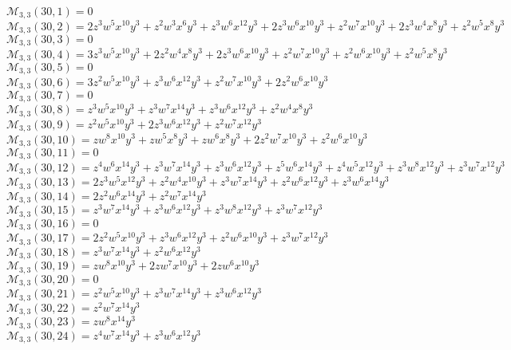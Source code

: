 $\mathcal{M}_{3,3}(30,1)=0$\\
$\mathcal{M}_{3,3}(30,2)=2z^3w^5x^{10}y^3+z^2w^3x^6y^3+z^3w^6x^{12}y^3+2z^3w^6x^{10}y^3+z^2w^7x^{10}y^3+2z^3w^4x^8y^3+z^2w^5x^8y^3$\\
$\mathcal{M}_{3,3}(30,3)=0$\\
$\mathcal{M}_{3,3}(30,4)=3z^3w^5x^{10}y^3+2z^2w^4x^8y^3+2z^3w^6x^{10}y^3+z^2w^7x^{10}y^3+z^2w^6x^{10}y^3+z^2w^5x^8y^3$\\
$\mathcal{M}_{3,3}(30,5)=0$\\
$\mathcal{M}_{3,3}(30,6)=3z^2w^5x^{10}y^3+z^3w^6x^{12}y^3+z^2w^7x^{10}y^3+2z^2w^6x^{10}y^3$\\
$\mathcal{M}_{3,3}(30,7)=0$\\
$\mathcal{M}_{3,3}(30,8)=z^3w^5x^{10}y^3+z^3w^7x^{14}y^3+z^3w^6x^{12}y^3+z^2w^4x^8y^3$\\
$\mathcal{M}_{3,3}(30,9)=z^2w^5x^{10}y^3+2z^3w^6x^{12}y^3+z^2w^7x^{12}y^3$\\
$\mathcal{M}_{3,3}(30,10)=zw^8x^{10}y^3+zw^5x^8y^3+zw^6x^8y^3+2z^2w^7x^{10}y^3+z^2w^6x^{10}y^3$\\
$\mathcal{M}_{3,3}(30,11)=0$\\
$\mathcal{M}_{3,3}(30,12)=z^4w^6x^{14}y^3+z^3w^7x^{14}y^3+z^3w^6x^{12}y^3+z^5w^6x^{14}y^3+z^4w^5x^{12}y^3+z^3w^8x^{12}y^3+z^3w^7x^{12}y^3$\\
$\mathcal{M}_{3,3}(30,13)=2z^3w^5x^{12}y^3+z^2w^4x^{10}y^3+z^3w^7x^{14}y^3+z^2w^6x^{12}y^3+z^3w^6x^{14}y^3$\\
$\mathcal{M}_{3,3}(30,14)=2z^2w^6x^{14}y^3+z^2w^7x^{14}y^3$\\
$\mathcal{M}_{3,3}(30,15)=z^3w^7x^{14}y^3+z^3w^6x^{12}y^3+z^3w^8x^{12}y^3+z^3w^7x^{12}y^3$\\
$\mathcal{M}_{3,3}(30,16)=0$\\
$\mathcal{M}_{3,3}(30,17)=2z^2w^5x^{10}y^3+z^3w^6x^{12}y^3+z^2w^6x^{10}y^3+z^3w^7x^{12}y^3$\\
$\mathcal{M}_{3,3}(30,18)=z^3w^7x^{14}y^3+z^2w^6x^{12}y^3$\\
$\mathcal{M}_{3,3}(30,19)=zw^8x^{10}y^3+2zw^7x^{10}y^3+2zw^6x^{10}y^3$\\
$\mathcal{M}_{3,3}(30,20)=0$\\
$\mathcal{M}_{3,3}(30,21)=z^2w^5x^{10}y^3+z^3w^7x^{14}y^3+z^3w^6x^{12}y^3$\\
$\mathcal{M}_{3,3}(30,22)=z^2w^7x^{14}y^3$\\
$\mathcal{M}_{3,3}(30,23)=zw^8x^{14}y^3$\\
$\mathcal{M}_{3,3}(30,24)=z^4w^7x^{14}y^3+z^3w^6x^{12}y^3$\\
